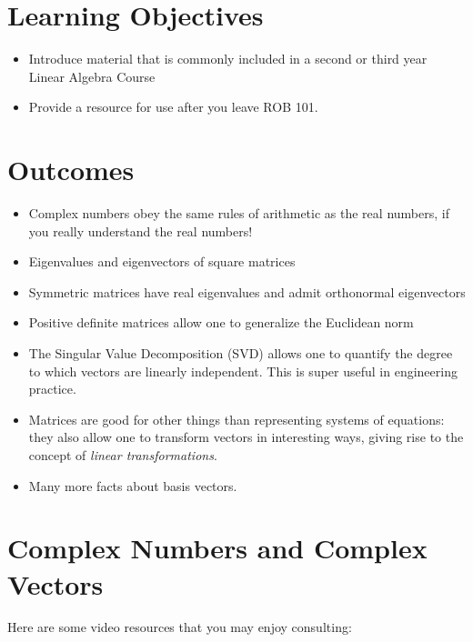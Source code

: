 


\section*{Learning Objectives}
\begin{itemize}
\item Introduce material that is commonly included in a second or third year Linear Algebra Course
\item Provide a resource for use after you leave ROB 101.
\end{itemize}

\section*{Outcomes}
\begin{itemize}
\item Complex numbers obey the same rules of arithmetic as the real numbers, if you really understand the real numbers!
\item Eigenvalues and eigenvectors of square matrices
\item Symmetric matrices have real eigenvalues and admit orthonormal eigenvectors 
\item Positive definite matrices allow one to generalize the Euclidean norm
\item The Singular Value Decomposition (SVD) allows one to quantify the degree to which vectors are linearly independent. This is super useful in engineering practice.
\item Matrices are good for other things than representing systems of equations: they also allow one to transform vectors in interesting ways, giving rise to the concept of \textit{linear transformations}.
\item Many more facts about basis vectors.
\end{itemize}


\vspace*{1.5cm}





\newpage


\section{Complex Numbers and Complex Vectors}
\label{sec:ComplexNumbers}

Here are some video resources that you may enjoy consulting:

